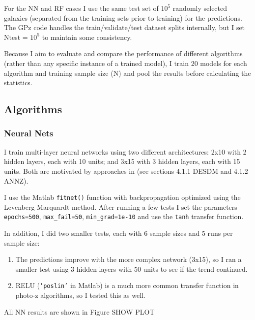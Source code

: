\documentclass[13pt]{amsart}
\newcommand{\figscale}[4]{
\begin{figure}[ht]
    \centering
    \caption{#3}
    \label{#4}
    \texttt{[image: \#2]}
\end{figure}
}
\begin{document}
  For the NN and RF cases I use the same test set of $10^5$ randomly selected galaxies (separated from the training sets prior to training) for the predictions. The GPz code handles the train/validate/test dataset splits internally, but I set Ntest = $10^5$ to maintain some consistency.

  Because I aim to evaluate and compare the performance of different algorithms (rather than any specific instance of a trained model), I train 20 models for each algorithm and training sample size (N) and pool the results before calculating the statistics.



  \subsection{Algorithms}
  \label{sec:algors}

    \subsubsection{Neural Nets}
    \label{sec:NN}

      I train multi-layer neural networks using two different architectures: 2x10 with 2 hidden layers, each with 10 units; and 3x15 with 3 hidden layers, each with 15 units. Both are motivated by approaches in \cite{pzreview} (see sections 4.1.1 DESDM and 4.1.2 ANNZ).

      I use the Matlab \texttt{fitnet()} function with backpropagation optimized using the Levenberg-Marquardt method. After running a few tests I set the parameters \texttt{epochs=500}, \texttt{max\_fail=50}, \texttt{min\_grad=1e-10} and use the \texttt{tanh} transfer function.

      In addition, I did two smaller tests, each with 6 sample sizes and 5 runs per sample size:

      \begin{enumerate}
        \item The predictions improve with the more complex network (3x15), so I ran a smaller test using 3 hidden layers with 50 units to see if the trend continued.

        \item RELU (\texttt{'poslin'} in Matlab) is a much more common transfer function in  photo-z algorithms, so I tested this as well.
      \end{enumerate}

      All NN results are shown in Figure SHOW PLOT %
\end{document}
